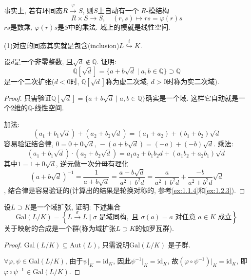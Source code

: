 \begin{remark}
    事实上, 若有环同态$R \overset{\varphi}\to S$, 则$S$上自动有一个
    $R$-模结构
    \[
        R \times S \to S, \quad (r, s) \mapsto rs = \varphi(r)s
    \]
    $rs$是数乘, $\varphi(r)s$是$S$中的乘法. 域上的模就是线性空间.
    
    (1)对应的同态其实就是包含(inclusion)$L \overset{i}\hookrightarrow K$.
\end{remark}

\begin{problem}
    设$d$是一个非零整数, 且$\sqrt d \notin \mathbb{Q}$. 证明: 
\[
    \mathbb{Q}[\sqrt{d}] = \{a + b\sqrt{d} \mid a, b \in \mathbb{Q}\} \supset \mathbb{Q}
\]
是一个二次扩张($d < 0$时, $\mathbb{Q}[\sqrt{d}]$称为虚二次域, $d > 0$时称为实二次域).
\end{problem}

\begin{proof}
    只需验证$\mathbb{Q}[\sqrt{d}] = \{a + b\sqrt{d} \mid a, b \in \mathbb{Q}\}$确实是一个域. 这样它自动就是一个$2$维的$\mathbb{Q}$-线性空间.
    
    加法:
    \[
        (a_1 + b_1\sqrt{d}) + (a_2 + b_2\sqrt{d}) = (a_1 + a_2) + (b_1 + b_2)\sqrt{d}
    \]
    容易验证结合律, $0 = 0 + 0\sqrt{d},\, -(a + b\sqrt{d}) = (-a) + (-b)\sqrt{d}$.
    乘法:
    \[
        (a_1 + b_1\sqrt{d}) \cdot (a_2 + b_2\sqrt{d}) = a_1a_2 + b_1b_2d + (a_1b_2 + a_2b_1)\sqrt{d}
    \]
    其中$1 = 1 + 0\sqrt{d}$, 逆元做一次分母有理化
    \[
        (a + b\sqrt{d})^{-1} = \frac{1}{a + b\sqrt{d}} = \frac{a - b\sqrt{d}}{a^2 + b^2d} = \frac{a}{a^2 + b^2d} + \frac{- b}{a^2 + b^2d}\sqrt{d}
    \],
    结合律是容易验证的(计算出的结果是轮换对称的, 参考\ref{ex:1.1.4}和\ref{ex:1.2.3}).
\end{proof}

\begin{problem}
    设$L \supset K$是一个域扩张, 证明: 下述集合
\[
\mathrm{Gal}(L/K)=
\left\{L \xrightarrow{\sigma} L \mid \sigma\text{ 是域同构},\text{ 且 } \sigma(a) = a \text{ 对任意 } a \in K \text{ 成立}\right\}
\]
关于映射的合成是一个群(称为域扩张$L\supset K$的伽罗瓦群).
\end{problem}

\begin{proof}
    $\mathrm{Gal}(L/K) \subseteq \mathrm{Aut}(L)$, 只需说明$\mathrm{Gal}(L/K)$
是子群.

    $\forall \varphi, \psi \in \mathrm{Gal}(L/K)$, 由于$\psi|_K = \mathrm{id}_K$,
因此$\psi^{-1}|_K = \mathrm{id}_K$, 故$(\varphi \circ \psi^{-1})|_K = \mathrm{id}_K$,
即$\varphi \circ \psi^{-1} \in \mathrm{Gal}(L/K)$.
\end{proof}

